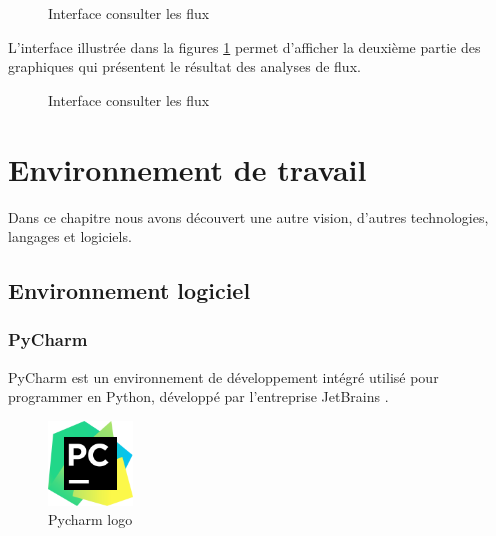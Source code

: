 \begin{figure}[!ht]\centering
{}
\caption{Interface consulter les flux}
\label{fig:flux1}
\end{figure} 
L'interface illustrée dans la figures \ref{fig:flux1} permet d'afficher la deuxième partie   
 des graphiques qui présentent le résultat des analyses de flux.  
\begin{figure}[!ht]\centering
{}
\caption{Interface consulter les flux}
\label{fig:flux2}
\end{figure} 
\section{Environnement de travail}
Dans ce chapitre nous avons découvert une autre vision, d'autres technologies, langages et logiciels.
\subsection{Environnement logiciel}
\subsubsection*{PyCharm }
PyCharm est un environnement de développement intégré utilisé pour programmer en Python,  d\'evelopp\'e par l'entreprise JetBrains .
\begin{figure}[!ht]\centering
\includegraphics[width=0.2\textwidth]{chapitres/chapitre7/figures/pycharme.png}
\caption{Pycharm logo}
\label{fig:pycharme}
\end{figure}
